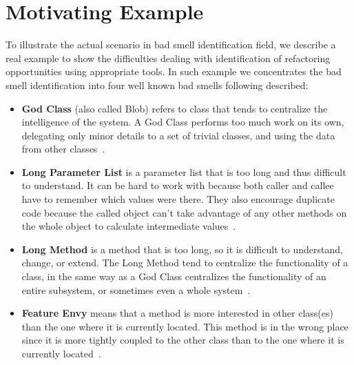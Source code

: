 \documentclass[conference]{IEEEtran}
\begin{document}


\section{Motivating Example}
\label{sec:motivation}

To illustrate the actual scenario in bad smell identification field, we describe a real example to show the difficulties dealing with identification of refactoring opportunities using appropriate tools. In such example we concentrates the bad smell identification into four well known bad smells following described:

\begin{itemize}
 \item \textbf{God Class} (also called Blob) refers to class that tends to centralize the intelligence of the system. A God Class performs too much work on its own, delegating only minor details to a set of trivial classes, and using the data from other classes~\cite{Lanza:2005}. 
 
 \item \textbf{Long Parameter List} is a parameter list that is too long and thus difficult to understand. It can be hard to work with because both caller and callee have to remember which values were there. They also encourage duplicate code because the called object can't take advantage of any other methods on the whole object to calculate intermediate values~\cite{FowlerMartin2002}.
 
 \item \textbf{Long Method} is a method that is too long, so it is difficult to understand, change, or extend. The Long Method tend to centralize the functionality of a class, in the same way as a God Class centralizes the functionality of an entire subsystem, or sometimes even a whole system~\cite{Fontana2012c}.
 
 \item \textbf{Feature Envy} means that a method is more interested in other class(es) than the one where it is currently located. This method is in the wrong place since it is more tightly coupled to the other class than to the one where it is currently located~\cite{Fontana2012c}.
\end{itemize}
\end{document}
